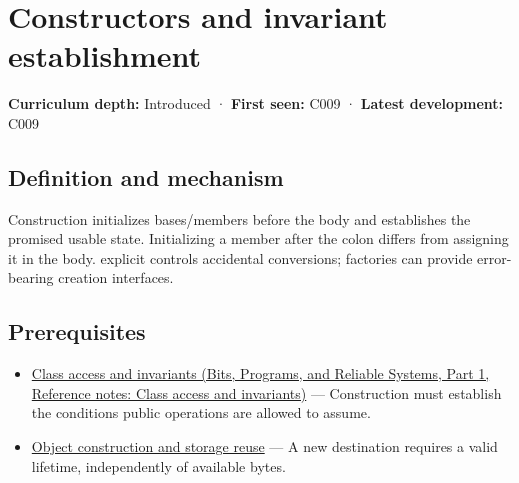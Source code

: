 \hypertarget{appendix-7f8ec83d0886}{}\label{referencestart:appendix-7f8ec83d0886}
\section{Constructors and invariant establishment}\label{appendix-7f8ec83d0886-constructors-and-invariant-establishment}

\hypertarget{appendix-7f8ec83d0886-constructors-and-invariant-establishment}{}

\textbf{Curriculum depth:} Introduced · \textbf{First seen:} C009 · \textbf{Latest development:} C009

\begin{allmightroledefinition}

\subsection{Definition and mechanism}\label{appendix-7f8ec83d0886-definition-and-mechanism}

\hypertarget{appendix-7f8ec83d0886-definition-and-mechanism}{}

Construction initializes bases/members before the body and establishes the promised usable state. Initializing a member after the colon differs from assigning it in the body. explicit controls accidental conversions; factories can provide error-bearing creation interfaces.

\end{allmightroledefinition}

\subsection{Prerequisites}\label{appendix-7f8ec83d0886-prerequisites}

\hypertarget{appendix-7f8ec83d0886-prerequisites}{}

\begin{itemize}
\tightlist
\item
  \href{../01-Bits-Programs-and-Reliable-Systems-P01/main.pdf\#nameddest=appendix-8e5214819615}{Class access and invariants (Bits, Programs, and Reliable Systems, Part 1, Reference notes: Class access and invariants)} --- Construction must establish the conditions public operations are allowed to assume.
\item
  \hyperref[appendix-a82f9c438857]{Object construction and storage reuse} --- A new destination requires a valid lifetime, independently of available bytes.
\end{itemize}

